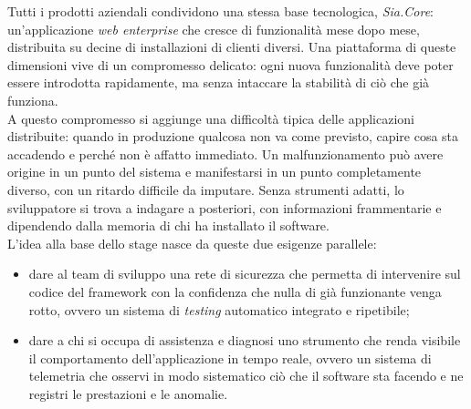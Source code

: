 Tutti i prodotti aziendali condividono una stessa base tecnologica,
\emph{Sia.Core}: un'applicazione \emph{web enterprise} che cresce di
funzionalità mese dopo mese, distribuita su decine di installazioni di
clienti diversi. Una piattaforma di queste dimensioni vive di un compromesso
delicato: ogni nuova funzionalità deve poter essere introdotta rapidamente,
ma senza intaccare la stabilità di ciò che già funziona.\\
A questo compromesso si aggiunge una difficoltà tipica delle applicazioni
distribuite: quando in produzione qualcosa non va come previsto, capire
cosa sta accadendo e perché non è affatto immediato. Un
malfunzionamento può avere origine in un punto del sistema e manifestarsi in
un punto completamente diverso, con un ritardo difficile da imputare. Senza
strumenti adatti, lo sviluppatore si trova a indagare a posteriori, con
informazioni frammentarie e dipendendo dalla memoria di chi ha installato il
software.\\
L'idea alla base dello stage nasce da queste due esigenze parallele:

\begin{itemize}
      \item dare al team di sviluppo una rete di sicurezza che permetta
            di intervenire sul codice del framework con la confidenza che
            nulla di già funzionante venga rotto, ovvero un sistema di
            \emph{testing} automatico integrato e ripetibile;
      \item dare a chi si occupa di assistenza e diagnosi uno strumento che
            renda visibile il comportamento dell'applicazione in tempo reale,
            ovvero un sistema di telemetria che osservi in modo
            sistematico ciò che il software sta facendo e ne registri le
            prestazioni e le anomalie.
\end{itemize}

